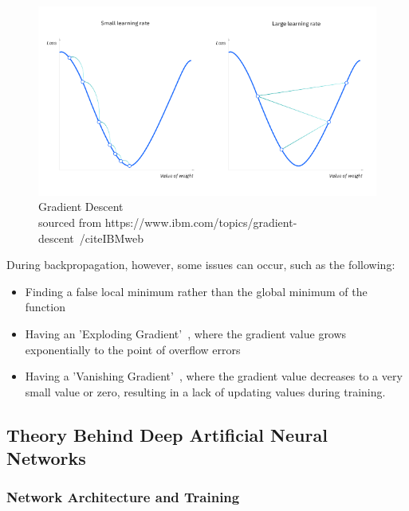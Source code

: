 \documentclass[./project-report/src/latex/project-report.tex]{subfiles}
\begin{document}
\begin{figure}[h!]
\centering
\includegraphics[width=1\textwidth]{./project-report/src/images/gradient-descent.png}
\caption{Gradient Descent\\
         sourced from https://www.ibm.com/topics/gradient-descent~/cite{IBMweb}}
\end{figure}

\pagebreak

During backpropagation, however, some issues can occur, such as the following:

\begin{itemize}
    \item Finding a false local minimum rather than the global minimum of the function
    \item Having an 'Exploding Gradient'~\cite{hunt2014artificial}, where the gradient value grows exponentially to the point of overflow errors
    \item Having a 'Vanishing Gradient'~\cite{hunt2014artificial}, where the gradient value decreases to a very small value or zero, resulting in a lack of updating values 
		  during training.
\end{itemize}

\pagebreak

\subsection{Theory Behind Deep Artificial Neural Networks}
\label{sec:deep-ann-theory}
\vspace{5mm}

\subsubsection{Network Architecture and Training}
\end{document}
